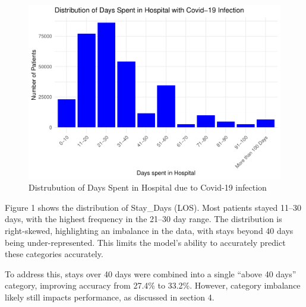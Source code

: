 \documentclass[
]{article}
\begin{document}
\begin{figure}

{\centering \includegraphics[width=0.9\linewidth]{B273025_final_big_data_rmd_final_files/figure-latex/unnamed-chunk-5-1} 

}

\caption{Distrubution of Days Spent in Hospital due to Covid-19 infection}\label{fig:unnamed-chunk-5}
\end{figure}

Figure 1 shows the distribution of Stay\_Days (LOS). Most patients
stayed 11--30 days, with the highest frequency in the 21--30 day range.
The distribution is right-skewed, highlighting an imbalance in the data,
with stays beyond 40 days being under-represented. This limits the
model's ability to accurately predict these categories accurately.

To address this, stays over 40 days were combined into a single ``above
40 days'' category, improving accuracy from 27.4\% to 33.2\%. However,
category imbalance likely still impacts performance, as discussed in
section 4.
\end{document}
